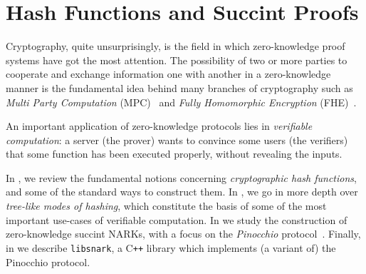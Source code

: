 \chapter{Hash Functions and Succint Proofs}\label{chap:crypto}
Cryptography, quite unsurprisingly, is the field in which zero-knowledge proof systems have 
got the most attention.
The possibility of two or more parties to cooperate and exchange information one with another in a 
zero-knowledge manner is the fundamental idea behind many branches of cryptography such as 
\emph{Multi Party Computation} (MPC)~\cite{Yao1982-2} and \emph{Fully Homomorphic Encryption} 
(FHE)~\cite{ArmknechtEtAl2015}.

An important application of zero-knowledge protocols lies in \emph{verifiable computation}:
a server (the prover) wants to convince some users (the verifiers) that some function has been 
executed properly, without revealing the inputs.

In , we review the fundamental notions concerning 
\emph{cryptographic hash functions}, and some of the standard ways to construct them.
In , we go in more depth over \emph{tree-like modes of hashing}, which 
constitute the basis of some of the most important use-cases of verifiable computation.
In  we study the construction of zero-knowledge succint NARKs, with a focus on 
the \emph{Pinocchio} protocol~\cite{ParnoGHR2013}.
Finally, in  we describe \texttt{libsnark}, a C\texttt{++} library which 
implements (a variant of) the Pinocchio protocol. 





